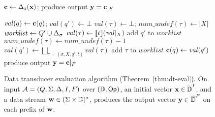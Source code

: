 \begin{figure}[t]
\vspace{-8pt}
\centering \footnotesize
\begin{algorithmic}

\State $\textbf{c} \gets \Delta_{\texttt{i}}(\textbf{x})$; produce output $\textbf{y} = \textbf{c}|_{F}$

        $\mathit{val}(q) \gets \textbf{c}(q)$;
        $\mathit{val}(q') \gets \bot$
    \EndFor
        $\mathit{val}(\tau) \gets \bot$;
        $\mathit{num\_undef}(\tau) \gets |X|$
    \EndFor
    \State $\mathit{worklist} \gets Q' \cup \Delta_\sigma$
            \State $\mathit{val}(\tau) \gets \llbracket t \rrbracket(\mathit{val}|_X)$
                add $q'$ to $\mathit{worklist}$
            \EndIf
                    $\mathit{num\_undef}(\tau) \gets \mathit{num\_undef}(\tau) - 1$
                \EndFor
            \EndIf
            \State $\mathit{val}(q') \gets \bigsqcup_{\tau = (\sigma, X, q', t)} \mathit{val}(\tau)$
                    add $\tau$ to $\mathit{worklist}$
                \EndIf
            \EndFor
        \EndIf
    \EndWhile
        $\textbf{c}(q) \gets \mathit{val}(q')$
    \EndFor
    \State produce output $\textbf{y} = \textbf{c}|_{F}$
\EndFor
\end{algorithmic}
\caption{Data transducer evaluation algorithm (Theorem~\ref{thm:dt-eval}). On input $\mathcal{A} = (Q, \Sigma, \Delta, I, F)$ over $(\mathbb{D}, \textsf{Op})$, an initial vector $\textbf{x} \in \overline{\mathbb{D}{}}^I$, and a data stream $\textbf{w} \in (\Sigma \times \mathbb{D})^*$, produces the output vector $\textbf{y} \in \overline{\mathbb{D}{}}^F$ on each prefix of $\textbf{w}$.
}
\label{fig:dt-eval-algorithm}
\end{figure}

